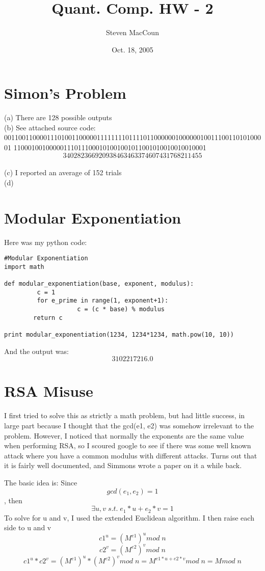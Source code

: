 \documentclass[12pt]{article}
\title{Quant. Comp. HW - 2}
\author{Steven MacCoun}
\date{Oct. 18, 2005}
\begin{document}
\maketitle						%



\section{Simon's Problem}

(a) There are 128 possible outputs
\\(b) See attached source code: \\00110011000011101001100000111111110111101100000010000001001110011010100001
110001001000001110111000101001001011001010010010010001
\[
\boxed{340282366920938463463374607431768211455}
\]
\\(c) I reported an average of 152 trials
\\(d) 

\section{Modular Exponentiation}

Here was my python code:

\begin{verbatim}
#Modular Exponentiation
import math

def modular_exponentiation(base, exponent, modulus):
         c = 1
         for e_prime in range(1, exponent+1):
                    c = (c * base) % modulus
        return c

print modular_exponentiation(1234, 1234*1234, math.pow(10, 10))
\end{verbatim}
And the output was: \[\boxed{3102217216.0}\] 


\section{RSA Misuse}

I first tried to solve this as strictly a math problem, but had little success, in large part because I thought that
the gcd(e1, e2) was somehow irrelevant to the problem. However, I noticed that normally the exponents are the same value
when performing RSA, so I scoured google to see if there was some well known attack where you have a common modulus with
different attacks. Turns out that it is fairly well documented, and Simmons wrote a paper on it a while back.

The basic idea is:
Since \[gcd(e_1,e_2) = 1\],
then \[\exists u, v   \;  s.t.   \;  e_1*u + e_2*v = 1\]
To solve for u and v, I used the extended Euclidean algorithm.
I then raise each side to u and v
\[c1^u = (M^{e1})^{u} mod \; n\]
\[c2^v = (M^{e2})^{v} mod \; n\]
\[c1^u * c2^v =  (M^{e1})^{u}*(M^{e2})^{v} mod \; n =  M^{e1*u + e2*v} mod \; n = M mod \; n\]
\end{document}
